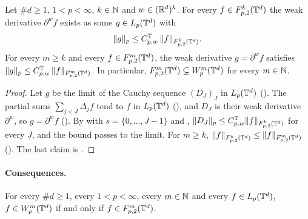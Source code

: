 \begin{theorem}
\label{thm:torus-triebel-lizorkin-to-sobolev}
\leanok
{}
Let $\#d \geq 1$, $1 < p < \infty$, $k \in \mathbb{N}$ and $w \in (\mathbb{R}^d)^k$. For every
$f \in F^{k}_{p,2}(\mathbb{T}^d)$ the weak derivative $\partial^w f$ exists as some $g \in L_p(\mathbb{T}^d)$
with
\[
  \|g\|_p \leq C^{\mathbb{T}}_{p,w} \, \|f\|_{F^{k}_{p,2}(\mathbb{T}^d)} .
\]
For every $m \geq k$ and every $f \in F^{m}_{p,2}(\mathbb{T}^d)$, the weak derivative $g = \partial^w f$
satisfies $\|g\|_p \leq C^{\mathbb{T}}_{p,w} \, \|f\|_{F^{m}_{p,2}(\mathbb{T}^d)}$. In particular,
$F^{m}_{p,2}(\mathbb{T}^d) \subseteq W^{m}_{p}(\mathbb{T}^d)$ for every $m \in \mathbb{N}$.
\end{theorem}

\begin{proof}
\leanok
Let $g$ be the limit of the Cauchy sequence $(D_J)_J$ in $L_p(\mathbb{T}^d)$
(). The partial sums $\sum_{j < J} \Delta_j f$ tend to
$f$ in $L_p(\mathbb{T}^d)$ (), and $D_J$ is their weak derivative
$\partial^w$, so $g = \partial^w f$ (). By
 with $s = \{0, \dots, J - 1\}$ and
,
$\|D_J\|_p \leq C^{\mathbb{T}}_{p,w} \|f\|_{F^{k}_{p,2}(\mathbb{T}^d)}$ for every $J$, and the bound passes to
the limit. For $m \geq k$,
$\|f\|_{F^{k}_{p,2}(\mathbb{T}^d)} \leq \|f\|_{F^{m}_{p,2}(\mathbb{T}^d)}$ ().
The last claim is .
\end{proof}

\paragraph{Consequences.}

\begin{corollary}[$\Sob{m}{p}(\T^d) = \TL{m}{p}{2}(\T^d)$]
\label{cor:torus-sobolev-triebel-lizorkin}
\leanok
{}
For every $\#d \geq 1$, every $1 < p < \infty$, every $m \in \mathbb{N}$ and every $f \in L_p(\mathbb{T}^d)$,
$f \in W^{m}_{p}(\mathbb{T}^d)$ if and only if $f \in F^{m}_{p,2}(\mathbb{T}^d)$.
\end{corollary}

